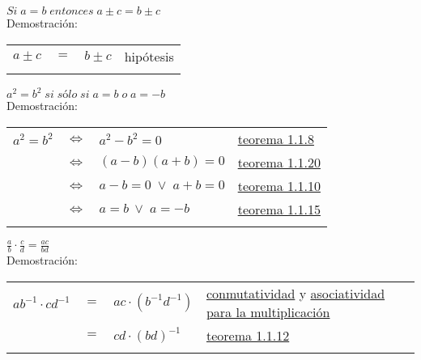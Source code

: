 \begin{teo} 
$Si \; a=b \; entonces \; a \pm c = b \pm c $ \label{teo 1.1.15}\\
Demostración:
\begin{center}
\begin{tabular}{r c l l}
$a\pm c$&$=$&$b\pm c$&hipótesis\\\\
\end{tabular}
\end{center}
\end{teo}


\begin{teo}
$a^2=b^2 \; si \; sólo \;  si \; a = b \; o \; a=-b$ \label{teo 1.1.16} \\
Demostración:
\begin{center}
\begin{tabular}{r c l l}
$a^2=b^2$&$\Leftrightarrow$&$a^2-b^2=0$&\hyperref[Teo 1.1.8]{teorema 1.1.8}\\
&$\Leftrightarrow$&$(a-b)(a+b)=0$&\hyperref[teo 1.1.20]{teorema 1.1.20}\\
&$\Leftrightarrow$&$a-b=0\; \lor \; a+b=0$&\hyperref[teo 1.1.10]{teorema 1.1.10}\\
&$\Leftrightarrow$&$a=b \: \lor \; a=-b$&\hyperref[teo 1.1.15]{teorema 1.1.15}\\\\
\end{tabular}
\end{center}
\end{teo}


\begin{teo}
$\displaystyle \frac{a}{b} \cdot \frac{c}{d} = \frac{ac}{bd}$\\ \label{teo 1.1.17}
Demostración: 
\begin{center}
\begin{tabular}{r c l l}
$ab^{-1}\cdot cd^{-1}$&$=$&$ac\cdot (b^{-1}d^{-1})$&\hyperref[M2]{conmutatividad} y \hyperref[M3]{asociatividad para la multiplicación}\\
&$=$&$cd\cdot (bd)^{-1}$&\hyperref[teo 1.1.12]{teorema 1.1.12}\\\\
\end{tabular}
\end{center}
\end{teo}


